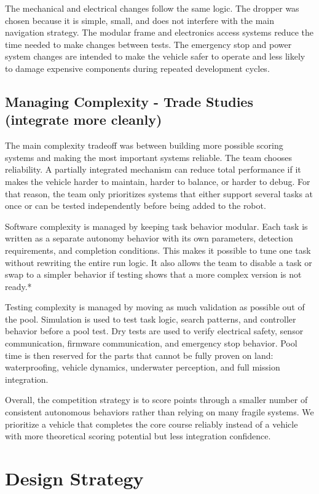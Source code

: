 \documentclass[conference]{IEEEtran}
\begin{document}
The mechanical and electrical changes follow the same logic. The dropper was chosen because it is simple, small, and does not interfere with the main navigation strategy. The modular frame and electronics access systems reduce the time needed to make changes between tests. The emergency stop and power system changes are intended to make the vehicle safer to operate and less likely to damage expensive components during repeated development cycles.

\subsection{Managing Complexity - Trade Studies (integrate more cleanly)}

The main complexity tradeoff was between building more possible scoring systems and making the most important systems reliable. The team chooses reliability. A partially integrated mechanism can reduce total performance if it makes the vehicle harder to maintain, harder to balance, or harder to debug. For that reason, the team only prioritizes systems that either support several tasks at once or can be tested independently before being added to the robot.

Software complexity is managed by keeping task behavior modular. Each task is written as a separate autonomy behavior with its own parameters, detection requirements, and completion conditions. This makes it possible to tune one task without rewriting the entire run logic. It also allows the team to disable a task or swap to a simpler behavior if testing shows that a more complex version is not ready.*

Testing complexity is managed by moving as much validation as possible out of the pool. Simulation is used to test task logic, search patterns, and controller behavior before a pool test. Dry tests are used to verify electrical safety, sensor communication, firmware communication, and emergency stop behavior. Pool time is then reserved for the parts that cannot be fully proven on land: waterproofing, vehicle dynamics, underwater perception, and full mission integration.

Overall, the competition strategy is to score points through a smaller number of consistent autonomous behaviors rather than relying on many fragile systems. We prioritize a vehicle that completes the core course reliably instead of a vehicle with more theoretical scoring potential but less integration confidence.

\section{Design Strategy}
\end{document}
